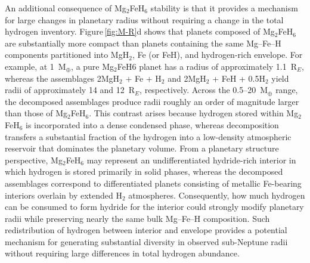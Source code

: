 \documentclass[draft,jgrga,12pt]{agujournal2019}
\begin{document}
An additional consequence of Mg$_2$FeH$_6$ stability is that it provides a mechanism for large changes in planetary radius without requiring a change in the total hydrogen inventory.
Figure\,\ref{fig:M-R}d shows that planets composed of Mg$_2$FeH$_6$ are substantially more compact than planets containing the same Mg--Fe--H components partitioned into MgH$_2$, Fe (or FeH), and hydrogen-rich envelope.
For example, at 1~M$_{\oplus}$, a pure Mg$_2$FeH$6$ planet has a radius of approximately 1.1~R$_E$, whereas the assemblages 2MgH$_2$ + Fe + H$_2$ and 2MgH$_2$ + FeH + 0.5H$_2$ yield radii of approximately 14 and 12~R$_E$, respectively.
Across the 0.5--20~M$_{\oplus}$ range, the decomposed assemblages produce radii roughly an order of magnitude larger than those of Mg$_2$FeH$_6$.
This contrast arises because hydrogen stored within Mg$_2$FeH$_6$ is incorporated into a dense condensed phase, whereas decomposition transfers a substantial fraction of the hydrogen into a low-density atmospheric reservoir that dominates the planetary volume.
From a planetary structure perspective, Mg$_2$FeH$_6$ may represent an undifferentiated hydride-rich interior in which hydrogen is stored primarily in solid phases, whereas the decomposed assemblages correspond to differentiated planets consisting of metallic Fe-bearing interiors overlain by extended H$_2$ atmospheres.
Consequently, how much hydrogen can be consumed to form hydride for the interior could strongly modify planetary radii while preserving nearly the same bulk Mg--Fe--H composition.
Such redistribution of hydrogen between interior and envelope provides a potential mechanism for generating substantial diversity in observed sub-Neptune radii without requiring large differences in total hydrogen abundance.


\end{document}
